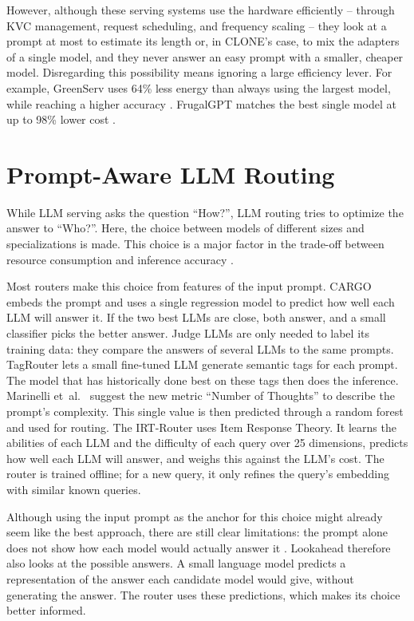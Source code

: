 However, although these serving systems use the hardware efficiently -- through KVC management, request scheduling, and frequency scaling -- they look at a prompt at most to estimate its length or, in CLONE's case, to mix the adapters of a single model, and they never answer an easy prompt with a smaller, cheaper model.
Disregarding this possibility means ignoring a large efficiency lever.
For example, GreenServ uses 64\% less energy than always using the largest model, while reaching a higher accuracy \cite{greenserv}.
FrugalGPT matches the best single model at up to 98\% lower cost \cite{frugalgpt}.


\section{Prompt-Aware LLM Routing}

While LLM serving asks the question ``How?'', LLM routing tries to optimize the answer to ``Who?''.
Here, the choice between models of different sizes and specializations is made.
This choice is a major factor in the trade-off between resource consumption and inference accuracy \cite{greenserv, frugalgpt, routellm}.

Most routers make this choice from features of the input prompt.
CARGO \cite{cargo} embeds the prompt and uses a single regression model to predict how well each LLM will answer it.
If the two best LLMs are close, both answer, and a small classifier picks the better answer.
Judge LLMs are only needed to label its training data: they compare the answers of several LLMs to the same prompts.
TagRouter \cite{tagrouter} lets a small fine-tuned LLM generate semantic tags for each prompt.
The model that has historically done best on these tags then does the inference.
Marinelli et~al.~\cite{noft} suggest the new metric ``Number of Thoughts'' to describe the prompt's complexity. This single value is then predicted through a random forest and used for routing.
The IRT-Router \cite{irtrouter} uses Item Response Theory. It learns the abilities of each LLM and the difficulty of each query over 25 dimensions, predicts how well each LLM will answer, and weighs this against the LLM's cost. The router is trained offline; for a new query, it only refines the query's embedding with similar known queries.

Although using the input prompt as the anchor for this choice might already seem like the best approach, there are still clear limitations: the prompt alone does not show how each model would actually answer it \cite{lookahead}.
Lookahead \cite{lookahead} therefore also looks at the possible answers.
A small language model predicts a representation of the answer each candidate model would give, without generating the answer.
The router uses these predictions, which makes its choice better informed.

